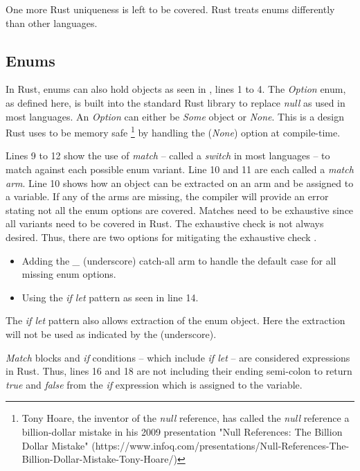 One more Rust uniqueness is left to be covered. Rust treats enums differently than other languages.

\subsection{Enums}
In Rust, enums can also hold objects \cite{klabnik_2019_01} as seen in , lines 1 to 4.
The \textit{Option} enum, as defined here, is built into the standard Rust library \cite{klabnik_2019_01} to replace \textit{null} as used in most languages.
An \textit{Option} can either be \textit{Some} object or \textit{None}.
This is a design Rust uses to be memory safe \footnote{Tony Hoare, the inventor of the \textit{null} reference, has called the \textit{null} reference a billion-dollar mistake in his 2009 presentation "Null References: The Billion Dollar Mistake" (https://www.infoq.com/presentations/Null-References-The-Billion-Dollar-Mistake-Tony-Hoare/)} by handling the (\textit{None}) option at compile-time.


Lines 9 to 12 show the use of \textit{match} -- called a \textit{switch} in most languages -- to match against each possible enum variant.
Line 10 and 11 are each called a \textit{match arm}.
Line 10 shows how an object can be extracted on an arm and be assigned to a  variable.
If any of the arms are missing, the compiler will provide an error stating not all the enum options are covered.
Matches need to be exhaustive since all variants need to be covered in Rust.
The exhaustive check is not always desired.
Thus, there are two options for mitigating the exhaustive check \cite{klabnik_2019_01}.

\begin{itemize}
	\item Adding the \textit{\_} (underscore) catch-all arm to handle the default case for all missing enum options.
	\item Using the \textit{if let} pattern as seen in line 14.
\end{itemize}

The \textit{if let} pattern also allows extraction of the enum object.
Here the extraction will not be used as indicated by the \outputh{\textit{\_}} (underscore).

\textit{Match} blocks and \textit{if} conditions -- which include \textit{if let} -- are considered expressions in Rust.
Thus, lines 16 and 18 are not including their ending semi-colon to return \textit{true} and \textit{false} from the \textit{if} expression which is assigned to the  variable.

